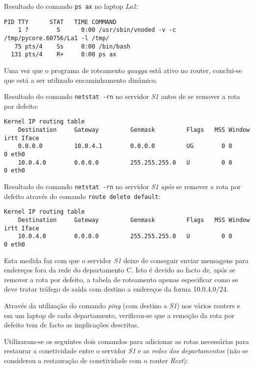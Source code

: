 Resultado do comando \texttt{ps ax} no laptop \emph{La1}:

\begin{Verbatim}[fontsize=\scriptsize]
  PID TTY      STAT   TIME COMMAND
    1 ?        S      0:00 /usr/sbin/vnoded -v -c /tmp/pycore.60756/La1 -l /tmp/
   75 pts/4    Ss     0:00 /bin/bash
  131 pts/4    R+     0:00 ps ax
\end{Verbatim}

Uma vez que o programa de roteamento \emph{quagga} está ativo no router,
conclui-se que está a ser utilizado encaminhamento dinâmico.


Resultado do comando \texttt{netstat -rn} no servidor \emph{S1} antes de se
remover a rota por defeito:

\begin{Verbatim}[fontsize=\scriptsize]
    Kernel IP routing table
    Destination     Gateway         Genmask         Flags   MSS Window  irtt Iface
    0.0.0.0         10.0.4.1        0.0.0.0         UG        0 0          0 eth0
    10.0.4.0        0.0.0.0         255.255.255.0   U         0 0          0 eth0
\end{Verbatim}

Resultado do comando \texttt{netstat -rn} no servidor \emph{S1} \emph{após} se
remover a rota por defeito através do comando \texttt{route delete default}:

\begin{Verbatim}[fontsize=\scriptsize]
    Kernel IP routing table
    Destination     Gateway         Genmask         Flags   MSS Window  irtt Iface
    10.0.4.0        0.0.0.0         255.255.255.0   U         0 0          0 eth0
\end{Verbatim}

Esta medida faz com que o servidor \emph{S1} deixe de conseguir enviar mensagens
para endereços fora da rede do departamento C. Isto é devido ao facto de, após
se remover a rota por defeito, a tabela de roteamento apenas especificar como se
deve tratar tráfego de saída com destino a endereços da forma 10.0.4.0/24.

Através da utilização do comando \emph{ping} (com destino a \emph{S1}) nos
vários routers e em um laptop de cada departamento, verificou-se que a remoção
da rota por defeito tem de facto as implicações descritas.


Utilizaram-se os seguintes dois comandos para adicionar as rotas necessárias
para restaurar a conetividade entre o servidor \emph{S1} e as \emph{redes dos
departamentos} (não se considerou a restauração de conetividade com o router
\emph{Rext}):

